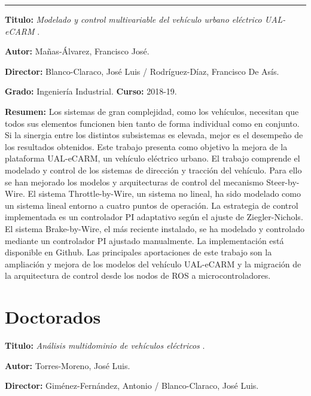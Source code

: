 \vspace{6pt} \hrule \vspace{6pt}

\textbf{Titulo:} \textit{Modelado y control multivariable del vehículo urbano eléctrico UAL-eCARM} \cite{manas2019UALeCARM}.

\textbf{Autor:} Mañas-Álvarez, Francisco José.

\textbf{Director:} Blanco-Claraco, José Luis / Rodríguez-Díaz, Francisco De Asís.

\textbf{Grado:} Ingeniería Industrial. \textbf{Curso:} 2018-19. 

 
\textbf{Resumen:} Los sistemas de gran complejidad, como los vehículos, necesitan que todos sus elementos funcionen bien tanto de forma individual como en conjunto. Si la sinergia entre los distintos subsistemas es elevada, mejor es el desempeño de los resultados obtenidos. Este trabajo presenta como objetivo la mejora de la plataforma UAL-eCARM, un vehículo eléctrico urbano. El trabajo comprende el modelado y control de los sistemas de dirección y tracción del vehículo. Para ello se han mejorado los modelos y arquitecturas de control del mecanismo Steer-by-Wire. El sistema Throttle-by-Wire, un sistema no lineal, ha sido modelado como un sistema lineal entorno a cuatro puntos de operación. La estrategia de control implementada es un controlador PI adaptativo según el ajuste de Ziegler-Nichols. El sistema Brake-by-Wire, el más reciente instalado, se ha modelado y controlado mediante un controlador PI ajustado manualmente. La implementación está disponible en Github. Las principales aportaciones de este trabajo son la ampliación y mejora de los modelos del vehículo UAL-eCARM y la migración de la arquitectura de control desde los nodos de ROS a
microcontroladores.
 
\section{Doctorados}
\textbf{Titulo:} \textit{Análisis multidominio de vehículos eléctricos} \cite{torres2014UALeCARM}.

\textbf{Autor:} Torres-Moreno, José Luis.

\textbf{Director:} Giménez-Fernández, Antonio / Blanco-Claraco, José Luis.

